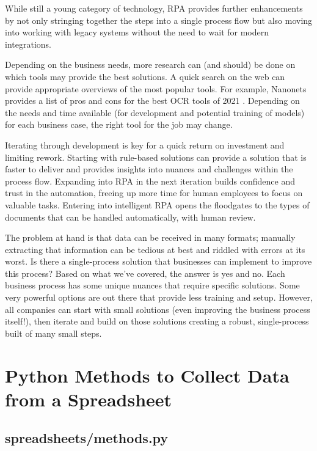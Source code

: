 \documentclass[conference]{IEEEtran}
\begin{document}
While still a young category of technology, RPA provides further enhancements by not only stringing together the steps into a single process flow but also moving into working with legacy systems without the need to wait for modern integrations.

Depending on the business needs, more research can (and should) be done on which tools may provide the best solutions. A quick search on the web can provide appropriate overviews of the most popular tools. For example, Nanonets provides a list of pros and cons for the best OCR tools of 2021 \cite{prithiv2021best}. Depending on the needs and time available (for development and potential training of models) for each business case, the right tool for the job may change.

Iterating through development is key for a quick return on investment and limiting rework. Starting with rule-based solutions can provide a solution that is faster to deliver and provides insights into nuances and challenges within the process flow. Expanding into RPA in the next iteration builds confidence and trust in the automation, freeing up more time for human employees to focus on valuable tasks. Entering into intelligent RPA opens the floodgates to the types of documents that can be handled automatically, with human review.

The problem at hand is that data can be received in many formats; manually extracting that information can be tedious at best and riddled with errors at its worst. Is there a single-process solution that businesses can implement to improve this process? Based on what we've covered, the answer is yes and no. Each business process has some unique nuances that require specific solutions. Some very powerful options are out there that provide less training and setup. However, all companies can start with small solutions (even improving the business process itself!), then iterate and build on those solutions creating a robust, single-process built of many small steps.




\onecolumn
\appendices

\newpage
\section{Python Methods to Collect Data from a Spreadsheet} \label{appendixOrderOne}
    \subsection{spreadsheets/methods.py}
    
\end{document}
